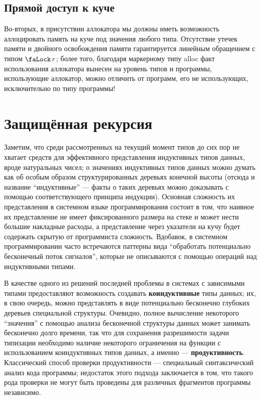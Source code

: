 \documentclass[12pt]{article}
\DeclareMathOperator{\access}{\text{\faLock}}
\DeclareMathOperator{\alloc}{alloc}
\DeclareMathOperator{\type}{type}
\begin{document}
\subsection{Прямой доступ к куче}

Во-вторых, в присутствии аллокатора мы должны иметь возможность аллоцировать
память на куче под значения любого типа. Отсутствие утечек памяти и двойного
освобождения памяти гарантируется линейным обращением с типом $\access r$; более
того, благодаря маркерному типу alloc факт использования аллокатора вынесен на
уровень типов и программы, использующие аллокатор, можно отличить от программ,
его не использующих, исключительно по типу программы!

\section{Защищённая рекурсия}

Заметим, что среди рассмотренных на текущий момент типов до сих пор не хватает
средств для эффективного представления индуктивных типов данных, вроде
натуральных чисел; о значениях индуктивных типов данных можно думать как об
особым образом структурированных деревьях конечной высоты (отсюда и название
``индуктивные'' --- факты о таких деревьях можно доказывать с помощью
соответствующего принципа индукции). Основная сложность их представления в
системном языке программирования состоит в том, что наивное их представление не
имеет фиксированного размера на стеке и может нести большие накладные расходы, а
представление через указатели на кучу будет содержать скрытую от программиста
сложность. Вдобавок, в системном программировании часто встречаются паттерны
вида ``обработать потенциально бесконечный поток сигналов'', которые не
описываются с помощью операций над индуктивными типами.

В качестве одного из решений последней проблемы в системах с зависимыми типами
предоставляют возможность создавать \textbf{коиндуктивные} типы данных; их, в
свою очередь, можно представлять в виде потенциально бесконечно глубоких
деревьев специальной структуры. Очевидно, полное вычисление некоторого
``значения'' с помощью анализа бесконечной структуры данных может занимать
бесконечно долго времени, так что для сохранения разрешимости задачи типизации
необходимо наличие некоторого ограничения на функции с использованием
коиндуктивных типов данных, а именно --- \textbf{продуктивность}. Классический
способ проверки продуктивности --- специальный синтаксический анализ кода
программы; недостаток этого подхода заключается в том, что такого рода проверки
не могут быть проведены для различных фрагментов программы независимо.
\end{document}
